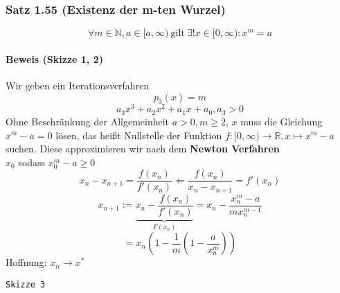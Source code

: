 \documentclass[a4paper]{scrartcl}
\DeclareMathOperator{\Forall}{\forall}%
\begin{document}
\subsubsection{Satz 1.55 (Existenz der m-ten Wurzel)}
\label{sec-2-9-22}
\[\Forall m\in\mathbb{N}, a\in[a,\infty)~\text{gilt}~\exists ! x\in [0,\infty): x^m = a\]
\paragraph{Beweis (Skizze 1, 2)}
\label{sec-2-9-22-1}
Wir geben ein Iterationsverfahren
\[p_3 (x) = m\]
\[a_3 x^3 + a_2 x^2 + a_1 x + a_0, a_3 > 0\]
Ohne Beschränkung der Allgemeinheit $a > 0,m\geq 2$, $x$ muss die Gleichung $x^m -a = 0$ lösen, das heißt Nullstelle der Funktion $f:[0,\infty) \to \mathbb{R},x\mapsto x^m - a$ suchen.
Diese approximieren wir nach dem \textbf{Newton Verfahren} \\
     $x_0$ sodass $x_0^m - a \geq 0$
\[x_n - x_{n + 1} = \frac{f(x_n)}{f'(x_n)} \Leftarrow \frac{f(x_n)}{x_n - x_{n + 1}} = f'(x_n)\]
\[x_{n+1} := \underbrace{x_n - \frac{f(x_n)}{f'(x_n)}}_{F(x_n)} = x_n - \frac{x_n^m - a}{m x_n^{m - 1}}\]
\[= x_n(1 - \frac{1}{m}(1 - \frac{a}{x_n^m}))\]
Hoffnung: $x_n \to x^*$

\texttt{Skizze 3}
\end{document}
